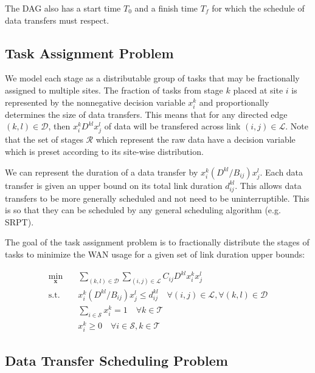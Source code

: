 The DAG also has a start time $T_0$ and a finish time $T_f$ for which the schedule of data transfers must respect.

\subsection{Task Assignment Problem}

We model each stage as a distributable group of tasks that may be fractionally assigned to multiple sites.
The fraction of tasks from stage $k$ placed at site $i$ is represented by the nonnegative decision variable $x_i^k$ and proportionally determines the size of data transfers.
This means that for any directed edge $(k,l)\in\mathcal{D}$, then $x_i^kD^{kl}x_j^l$ of data will be transfered across link $(i,j)\in\mathcal{L}$.
Note that the set of stages $\mathcal{R}$ which represent the raw data have a decision variable which is preset according to its site-wise distribution.

We can represent the duration of a data transfer by $x_i^k(D^{kl}/B_{ij})x_j^l$.
Each data transfer is given an upper bound on its total link duration $d_{ij}^{kl}$.
This allows data transfers to be more generally scheduled and not need to be uninterruptible.
This is so that they can be scheduled by any general scheduling algorithm (e.g. SRPT).

The goal of the task assignment problem is to fractionally distribute the stages of tasks to minimize the WAN usage for a given set of link duration upper bounds:

\begin{subequations}
	\begin{align}
		\min_{\mathbf{x}} \quad & \sum_{(k,l)\in\mathcal{D}}\sum_{(i,j)\in\mathcal{L}}C_{ij}D^{kl}x_i^kx_j^l \\
		\text{s.t.}\quad & x_i^k(D^{kl}/B_{ij})x_j^l \leq d_{ij}^{kl} \quad \forall(i,j)\in\mathcal{L}, \forall(k,l)\in\mathcal{D} \\
		& \sum_{i\in\mathcal{S}}x_i^k = 1 \quad \forall k\in\mathcal{T} \\
		& x_i^k \geq 0 \quad \forall i\in\mathcal{S},k\in\mathcal{T}
	\end{align}
\end{subequations}

\subsection{Data Transfer Scheduling Problem}

